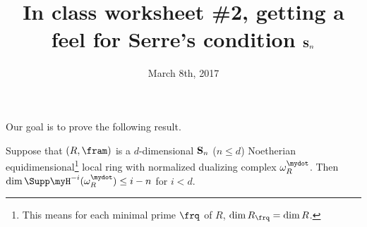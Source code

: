 \documentclass[12pt]{amsart}
\numberwithin{equation}{theorem}
\renewcommand{\:}{\colon}
\theoremstyle{theorem}
\begin{document}
\title{In class worksheet \#2, getting a feel for Serre's condition ${\bf S}_n$}
\author{March 8th, 2017}



\maketitle

%
%

Our goal is to prove the following result.
\begin{proposition*}
Suppose that $(R, \fram)$ is a $d$-dimensional ${\bf S}_n$ ($n \leq d$) Noetherian equidimensional\footnote{This means for each minimal prime $\frq$ of $R$, $\dim R_{\frq} = \dim R$.} local ring with normalized dualizing complex $\omega_R^{\mydot}$.  Then $\dim \Supp \myH^{-i}(\omega_R^{\mydot}) \leq i - n$ for $i < d$.
\end{proposition*}
\end{document}
